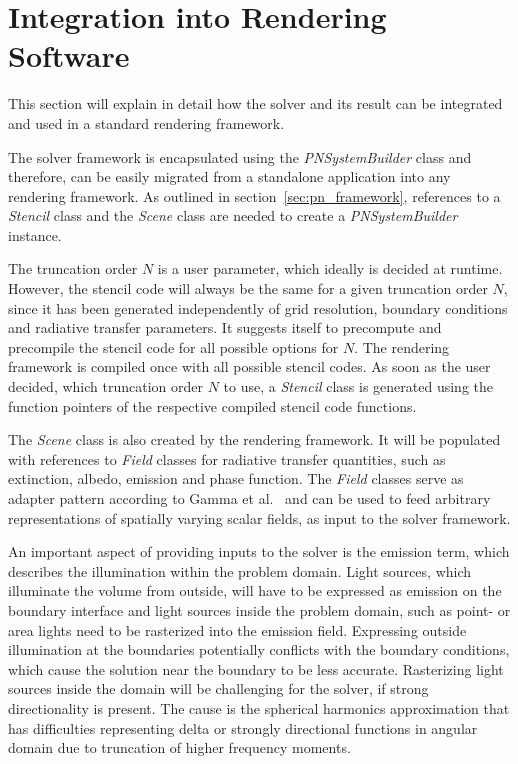 \section{Integration into Rendering Software}
\label{sec:pn_rendering_integration}

This section will explain in detail how the solver and its result can be integrated and used in a standard rendering framework.

The solver framework is encapsulated using the \emph{PNSystemBuilder} class and therefore, can be easily migrated from a standalone application into any rendering framework. As outlined in section~\ref{sec:pn_framework}, references to a \emph{Stencil} class and the \emph{Scene} class are needed to create a \emph{PNSystemBuilder} instance.

The truncation order $N$ is a user parameter, which ideally is decided at runtime. However, the stencil code will always be the same for a given truncation order $N$, since it has been generated independently of grid resolution, boundary conditions and radiative transfer parameters. It suggests itself to precompute and precompile the stencil code for all possible options for $N$. The rendering framework is compiled once with all possible stencil codes. As soon as the user decided, which truncation order $N$ to use, a \emph{Stencil} class is generated using the function pointers of the respective compiled stencil code functions.

The \emph{Scene} class is also created by the rendering framework. It will be populated with references to \emph{Field} classes for radiative transfer quantities, such as extinction, albedo, emission and phase function. The \emph{Field} classes serve as adapter pattern according to Gamma et al.~\cite{Gamma95} and can be used to feed arbitrary representations of spatially varying scalar fields, as input to the solver framework.

An important aspect of providing inputs to the solver is the emission term, which describes the illumination within the problem domain. Light sources, which illuminate the volume from outside, will have to be expressed as emission on the boundary interface and light sources inside the problem domain, such as point- or area lights need to be rasterized into the emission field. Expressing outside illumination at the boundaries potentially conflicts with the boundary conditions, which cause the solution near the boundary to be less accurate. Rasterizing light sources inside the domain will be challenging for the solver, if strong directionality is present. The cause is the spherical harmonics approximation that has difficulties representing delta or strongly directional functions in angular domain due to truncation of higher frequency moments.

